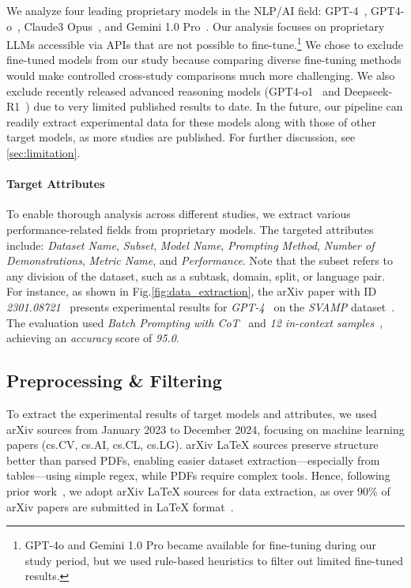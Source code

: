 We analyze four leading proprietary models in the NLP/AI field: GPT-4~\citep{achiam2023gpt}, GPT4-o~\citep{hurst2024gpt}, Claude3 Opus~\citep{anthropic@claude}, and Gemini 1.0 Pro~\citep{team2023gemini}. 
Our analysis focuses on proprietary LLMs accessible via APIs that are not possible to fine-tune.\footnote{GPT-4o and Gemini 1.0 Pro became available for fine-tuning during our study period, but we used rule-based heuristics to filter out limited fine-tuned results.} We chose to exclude fine-tuned models from our study because comparing diverse fine-tuning methods would make controlled cross-study comparisons much more challenging. 
We also exclude recently released advanced reasoning models (GPT4-o1~\citep{GPT4o1} and Deepseek-R1~\citep{guo2025deepseek}) due to very limited published results to date. 
In the future, our pipeline can readily extract experimental data for these models along with those of other target models, as more studies are published. 
For further discussion, see \cref{sec:limitation}.


\paragraph{Target Attributes} To enable thorough analysis across different studies, we extract various performance-related fields from proprietary models.
The targeted attributes include: \textit{Dataset Name}, \textit{Subset}, \textit{Model Name}, \textit{Prompting Method}, \textit{Number of Demonstrations}, \textit{Metric Name}, and \textit{Performance}. 
Note that the subset refers to any division of the dataset, such as a subtask, domain, split, or language pair.
For instance, as shown in Fig.\ref{fig:data_extraction}, the arXiv paper with ID \textit{2301.08721}~\citep{cheng2023batch} presents experimental results for \textit{GPT-4}~\citep{achiam2023gpt} on the \textit{SVAMP} dataset~\citep{patel2021nlp}. 
The evaluation used \textit{Batch Prompting with CoT}~\citep{wei2022chain, cheng2023batch} and \textit{12 in-context samples}~\citep{brown2020language}, achieving an \textit{accuracy} score of \textit{95.0}.

\subsection{Preprocessing \& Filtering}
\label{subsection:preprocessing}

To extract the experimental results of target models and attributes, we used arXiv sources from January 2023 to December 2024, focusing on machine learning papers (cs.CV, cs.AI, cs.CL, cs.LG). 
arXiv LaTeX sources preserve structure better than parsed PDFs, enabling easier dataset extraction—especially from tables—using simple regex, while PDFs require complex tools. 
Hence, following prior work~\citep{kardas2020axcell, bai2023schema, wang2024charxiv}, we adopt arXiv LaTeX sources for data extraction, as over 90\% of arXiv papers are submitted in LaTeX format~\citep{frankston2024html}.

